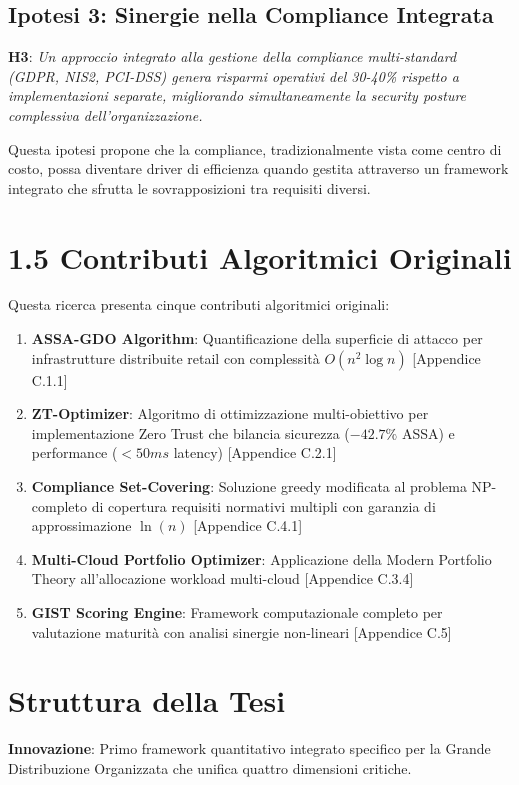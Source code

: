 \begin{bibunit}[IEEEtran]
\subsection{Ipotesi 3: Sinergie nella Compliance Integrata}

\textbf{H3}: \textit{Un approccio integrato alla gestione della compliance multi-standard (GDPR, NIS2, PCI-DSS) genera risparmi operativi del 30-40\% rispetto a implementazioni separate, migliorando simultaneamente la security posture complessiva dell'organizzazione.}

Questa ipotesi propone che la compliance, tradizionalmente vista come centro di costo, possa diventare driver di efficienza quando gestita attraverso un framework integrato che sfrutta le sovrapposizioni tra requisiti diversi.

\section{1.5 Contributi Algoritmici Originali}

Questa ricerca presenta cinque contributi algoritmici originali:

\begin{enumerate}
\item \textbf{ASSA-GDO Algorithm}: Quantificazione della superficie di attacco 
per infrastrutture distribuite retail con complessità $O(n^2\log n)$ 
[Appendice C.1.1]

\item \textbf{ZT-Optimizer}: Algoritmo di ottimizzazione multi-obiettivo per 
implementazione Zero Trust che bilancia sicurezza ($-42.7\%$ ASSA) e 
performance ($<50ms$ latency) [Appendice C.2.1]

\item \textbf{Compliance Set-Covering}: Soluzione greedy modificata al problema 
NP-completo di copertura requisiti normativi multipli con garanzia di 
approssimazione $\ln(n)$ [Appendice C.4.1]

\item \textbf{Multi-Cloud Portfolio Optimizer}: Applicazione della Modern 
Portfolio Theory all'allocazione workload multi-cloud [Appendice C.3.4]

\item \textbf{GIST Scoring Engine}: Framework computazionale completo per 
valutazione maturità con analisi sinergie non-lineari [Appendice C.5]
\end{enumerate}
\section{Struttura della Tesi}
\begin{tcolorbox}[
    colback=blue!5!white,
    colframe=blue!75!black,
    title={\textbf{Innovation Box 1.1:} Framework GIST - Contributo Metodologico Principale},
    fonttitle=\bfseries,
    boxrule=1.5pt,
    arc=2mm,
    breakable
]
\textbf{Innovazione}: Primo framework quantitativo integrato specifico per la Grande Distribuzione Organizzata che unifica quattro dimensioni critiche.


\end{tcolorbox}
\end{bibunit}
